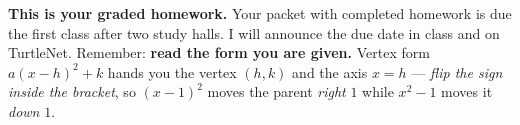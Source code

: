 \documentclass[12pt]{article}
\begin{document}

\vspace{0.10in}

\boxguard[8]
\begin{remindbox}
\small
\textbf{This is your graded homework.} Your packet with completed homework is due the first
class after two study halls. I will announce the due date in class and on TurtleNet. Remember:
\textbf{read the form you are given.} Vertex form $a(x-h)^2+k$ hands you the vertex $(h,k)$ and
the axis $x=h$ --- \emph{flip the sign inside the bracket}, so $(x-1)^2$ moves the parent
\emph{right} $1$ while $x^2-1$ moves it \emph{down} $1$.
\end{remindbox}

\vspace{0.10in}
\end{document}
